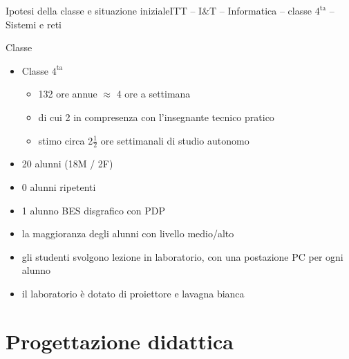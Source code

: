 \documentclass[italian]{beamer}
\begin{document}
\begin{frame}{Ipotesi della classe e situazione iniziale}{ITT -- I\&T -- Informatica -- classe $4^{\text{ta}}$ -- Sistemi e reti}
	
	\begin{block}{Classe}
		\begin{itemize}
			\item Classe $4^{\text{ta}}$
			\begin{itemize}
				\item 132 ore annue $\approx$ 4 ore a settimana
				\item di cui 2 in compresenza con l'insegnante tecnico pratico
				\item stimo circa 2$\frac{1}{2}$ ore settimanali di studio autonomo
			\end{itemize}			
			\item 20 alunni (18M / 2F)
			\item 0 alunni ripetenti
			\item 1 alunno BES disgrafico con PDP
			\item la maggioranza degli alunni con livello medio/alto
			\item gli studenti svolgono lezione in laboratorio, con una postazione PC per ogni alunno
			\item il laboratorio \`e dotato di proiettore e lavagna bianca
		\end{itemize}
	\end{block}
	
\end{frame}

\section[Progettazione didattica]{Progettazione didattica}
\end{document}
